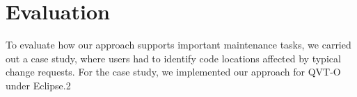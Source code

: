 
\section{Evaluation}\label{sec:evaluation}


To evaluate how our approach supports important maintenance tasks, we carried out a case study, where users had to identify code locations affected by typical change requests. For the case study, we implemented our approach for QVT-O under Eclipse.2